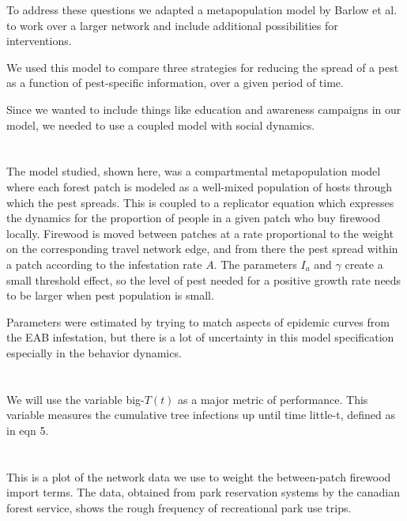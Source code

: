 \documentclass{article}
\begin{document}
To address these questions we adapted a metapopulation model by Barlow et al. to work over a larger network and include additional possibilities for interventions.

We used this model to compare three strategies for reducing the spread of a pest as a function of pest-specific information, over a given period of time.

Since we wanted to include things like education and awareness campaigns in our model, we needed to use a coupled model with social dynamics. 

\section{}

The model studied, shown here, was a compartmental metapopulation model where each forest patch is modeled as a well-mixed population of hosts through which the pest spreads. This is coupled to a replicator equation which expresses the dynamics for the proportion of people in a given patch who buy firewood locally. Firewood is moved between patches at a rate proportional to the weight on the corresponding travel network edge, and from there the pest spread within a patch according to the infestation rate $A$. The parameters $I_a$ and $\gamma$ create a small threshold effect, so the level of pest needed for a positive growth rate needs to be larger when pest population is small. 

Parameters were estimated by trying to match aspects of epidemic curves from the EAB infestation, but there is a lot of uncertainty in this model specification especially in the behavior dynamics. 

\section{}

We will use the variable big-$T(t)$ as a major metric of performance. This variable measures the cumulative tree infections up until time little-t, defined as in eqn 5.

\section{}

This is a plot of the network data we use to weight the between-patch firewood import terms. The data, obtained from park reservation systems by the canadian forest service, shows the rough frequency of recreational park use trips.
\end{document}

